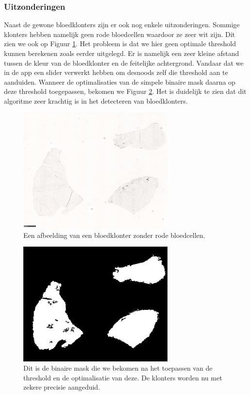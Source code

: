 \documentclass[a4paper,kulak]{kulakarticle}
\begin{document}
\subsubsection{Uitzonderingen}
Naast de gewone bloedklonters zijn er ook nog enkele uitzonderingen. Sommige klonters hebben namelijk geen rode bloedcellen waardoor ze zeer wit zijn. Dit zien we ook op Figuur \ref{figuur lichte_kleuring}. Het probleem is dat we hier geen optimale threshold kunnen berekenen zoals eerder uitgelegd. Er is namelijk een zeer kleine afstand tussen de kleur van de bloedklonter en de feitelijke achtergrond. Vandaar dat we in de app een slider verwerkt hebben om desnoods zelf die threshold aan te aanduiden. Wanneer de optimalisaties van de simpele binaire mask daarna op deze threshold toegepassen, bekomen we Figuur \ref{figuur lichte_kleuring_binair}. Het is duidelijk te zien dat dit algoritme zeer krachtig is in het detecteren van bloedklonters.

\begin{figure}[H]
	\centering
	\includegraphics[width=0.7\textwidth]{lichte_kleuring}
	
	\caption{Een afbeelding van een bloedklonter zonder rode bloedcellen.}
	\label{figuur lichte_kleuring}
\end{figure}

\begin{figure}[H]
	\centering
	\includegraphics[width=0.7\textwidth]{lichte_kleuring_binair}
	
	\caption{Dit is de binaire mask die we bekomen na het toepassen van de threshold en de optimalisatie van deze. De klonters worden nu met zekere precisie aangeduid.}
	\label{figuur lichte_kleuring_binair}
\end{figure}
\end{document}
